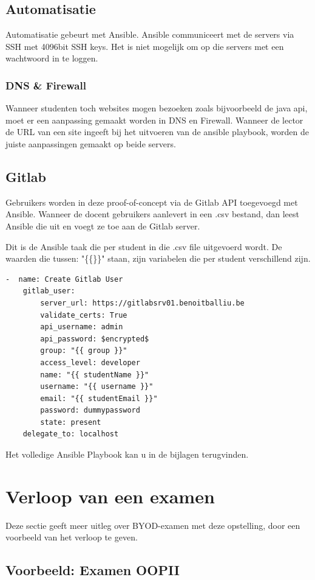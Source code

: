 \subsection{Automatisatie}
Automatisatie gebeurt met Ansible. Ansible communiceert met de servers via SSH met 4096bit SSH keys. Het is niet mogelijk om op die servers met een wachtwoord in te loggen.

\subsubsection{DNS \& Firewall}
Wanneer studenten toch websites mogen bezoeken zoals bijvoorbeeld de java api, moet er een aanpassing gemaakt worden in DNS en Firewall. Wanneer de lector de URL van een site ingeeft bij het uitvoeren van de ansible playbook, worden de juiste aanpassingen gemaakt op beide servers.

\subsection{Gitlab}
Gebruikers worden in deze proof-of-concept via de Gitlab API toegevoegd met Ansible. Wanneer de docent gebruikers aanlevert in een .csv bestand, dan leest Ansible die uit en voegt ze toe aan de Gitlab server. 

Dit is de Ansible taak die per student in die .csv file uitgevoerd wordt. De waarden die tussen: "\{\{\}\}"   staan, zijn variabelen die per student verschillend zijn.
\lstset{basicstyle=\ttfamily}
\begin{lstlisting}
-  name: Create Gitlab User
	gitlab_user:
		server_url: https://gitlabsrv01.benoitballiu.be
		validate_certs: True
		api_username: admin
		api_password: $encrypted$
		group: "{{ group }}"
		access_level: developer
		name: "{{ studentName }}"
		username: "{{ username }}"
		email: "{{ studentEmail }}"
		password: dummypassword
		state: present
	delegate_to: localhost
\end{lstlisting}

Het volledige Ansible Playbook kan u in de bijlagen terugvinden.

\section{Verloop van een examen}
Deze sectie geeft meer uitleg over BYOD-examen met deze opstelling, door een voorbeeld van het verloop te geven.

\subsection{Voorbeeld: Examen OOPII}

